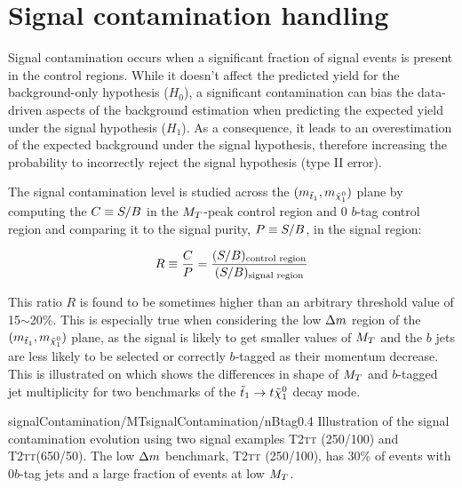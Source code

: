    \section{Signal contamination handling \label{sec:signalContamination}}

        Signal contamination occurs when a significant fraction of signal events is present in
        the control regions. While it doesn't affect the predicted yield for the background-only hypothesis
        ($H_0$), a significant contamination can bias the data-driven aspects of the background
        estimation when predicting the expected yield under the signal hypothesis ($H_1$). As a
        consequence, it leads to an overestimation of the expected background under the signal hypothesis,
        therefore increasing the probability to incorrectly reject the signal hypothesis (type II error).

        The signal contamination level is studied across the $(m_{\tilde{t}_1},m_{\tilde{\chi}_1^0})$
        plane by computing the $C \equiv S/B$ in the $M_T$-peak control region and 0 $b$-tag
        control region and comparing it to the signal purity, $P \equiv S/B$, in the signal region:

        \begin{equation}
            R \equiv \frac{C}{P} = \frac{(S/B)_\text{control region}}{(S/B)_\text{signal region}}
            \label{eq:contaminationRatio}
        \end{equation}

        This ratio $R$ is found to be sometimes higher than an arbitrary threshold value of 15$\sim$20\%.
        This is especially true when considering the low $\Delta m$ region of the $(m_{\tilde{t}_1},
        m_{\tilde{\chi}_1^0})$ plane, as the signal is likely to get smaller values of $M_T$ and the $b$ jets
        are less likely to be selected or correctly $b$-tagged as their momentum decrease. This is illustrated
        on  which shows the differences in shape of $M_T$ and
        $b$-tagged jet multiplicity for two benchmarks of the $\tilde{t}_1 \rightarrow t \tilde{\chi}_1^0$ decay mode.

                         {signalContamination/MT}{signalContamination/nBtag}{0.4}
                         {Illustration of the signal contamination evolution using two signal examples
                         \textsc{T2tt} (250/100) and \textsc{T2tt}(650/50). The low $\Delta m$ benchmark, \textsc{T2tt} (250/100),
                         has 30\% of events with 0$b$-tag jets and a large fraction of events at low $M_T$.}

